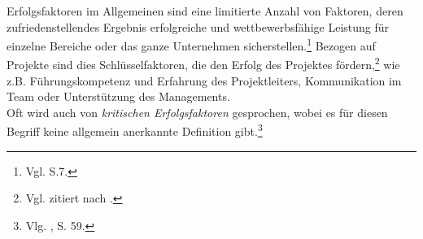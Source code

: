 Erfolgsfaktoren im Allgemeinen sind eine limitierte Anzahl von Faktoren, deren zufriedenstellendes Ergebnis erfolgreiche und 
wettbewerbsfähige Leistung für einzelne Bereiche oder das ganze Unternehmen sicherstellen.\footnote{Vgl. \cite{Bullen.1981} S.7.}
Bezogen auf Projekte sind dies Schlüsselfaktoren, die den Erfolg des Projektes fördern,\footnote{Vgl. \cite{Buschermohle.2010} zitiert nach \cite{Basten.2012}.} wie
z.B. Führungskompetenz und Erfahrung des Projektleiters, Kommunikation im Team oder Unterstützung des Managements.\\
Oft wird auch von \textit{kritischen Erfolgsfaktoren} gesprochen, wobei es für diesen Begriff keine allgemein anerkannte Definition gibt.\footnote{Vlg. \cite{Basten.2012}, S. 59.}